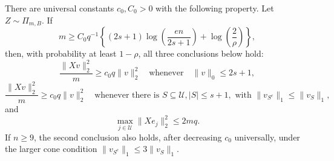 There are universal constants \(c_0,C_0>0\) with the following property.  Let \(Z\sim\Pi_{m,B}\).  If
\[
 m\ge C_0q^{-1}\left\{(2s+1)\log\!\left(\frac{en}{2s+1}\right)+\log\!\left(\frac2\rho\right)\right\},
\]
then, with probability at least \(1-\rho\), all three conclusions below hold:
\[
 \frac{\lVert Xv\rVert_2^2}{m}\ge c_0q\lVert v\rVert_2^2
 \quad\text{whenever}\quad
 \lVert v\rVert_0\le2s+1,
\]
\[
 \frac{\lVert Xv\rVert_2^2}{m}\ge c_0q\lVert v\rVert_2^2
 \quad\text{whenever there is }S\subseteq\mathcal U, |S|\le s+1,
 \text{ with }\lVert v_{S^c}\rVert_1\le\lVert v_S\rVert_1,
\]
and
\[
 \max_{j\in\mathcal U}\lVert Xe_j\rVert_2^2\le2mq.
\]
If \(n\ge9\), the second conclusion also holds, after decreasing \(c_0\) universally, under the larger cone condition \(\lVert v_{S^c}\rVert_1\le3\lVert v_S\rVert_1\).